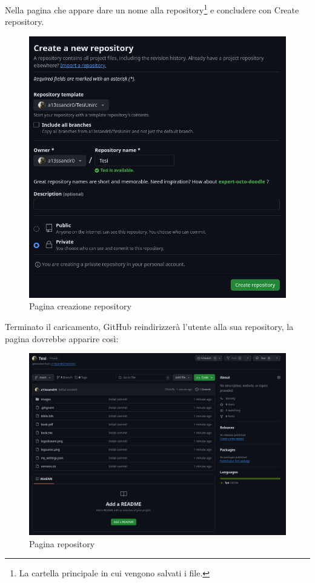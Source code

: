 \documentclass[envcountsame,envcountchap]{svmono}
\begin{document}
\label{nota_pie_pagina}
Nella pagina che appare dare un nome alla repository\footnote{La 
cartella principale in cui vengono salvati i file.} e concludere con Create repository.
\begin{figure}[H]
    \centering
    \includegraphics[width=\linewidth]{images/github/new_repo.png}
    \caption{Pagina creazione repository}
    \label{pagina_creazione_repository}
\end{figure}

Terminato il caricamento, GitHub reindirizzerà l'utente alla sua repository, 
la pagina dovrebbe apparire così:

\begin{figure}[H]
    \centering
    \includegraphics[width=1.5\linewidth]{images/github/new_repo_created.png}
    \caption{Pagina repository}
    \label{pagina_repository}
\end{figure}
\end{document}
